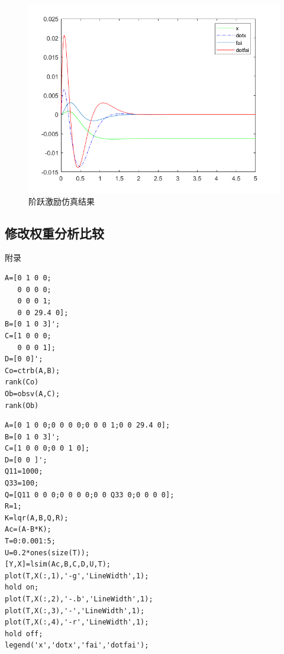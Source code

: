 \begin{figure}[hbpt]
\centering
\includegraphics[width=12cm]{1000_100_2.png}
\caption{阶跃激励仿真结果}\label{1000_100_2}
\end{figure}

\subsection{修改权重分析比较}


\newpage
	\appendix
	\begin{center}
		\heiti{} 附\hspace{1pc}录
	\end{center}

\begin{lstlisting}
A=[0 1 0 0;
   0 0 0 0;
   0 0 0 1;
   0 0 29.4 0];
B=[0 1 0 3]';
C=[1 0 0 0;
   0 0 0 1];
D=[0 0]';
Co=ctrb(A,B);
rank(Co)
Ob=obsv(A,C);
rank(Ob)
\end{lstlisting}

\begin{lstlisting}
A=[0 1 0 0;0 0 0 0;0 0 0 1;0 0 29.4 0];
B=[0 1 0 3]';
C=[1 0 0 0;0 0 1 0];
D=[0 0 ]';
Q11=1000;
Q33=100;
Q=[Q11 0 0 0;0 0 0 0;0 0 Q33 0;0 0 0 0];
R=1;
K=lqr(A,B,Q,R);
Ac=(A-B*K);
T=0:0.001:5;
U=0.2*ones(size(T));
[Y,X]=lsim(Ac,B,C,D,U,T);
plot(T,X(:,1),'-g','LineWidth',1);
hold on;
plot(T,X(:,2),'-.b','LineWidth',1);
plot(T,X(:,3),'-','LineWidth',1);
plot(T,X(:,4),'-r','LineWidth',1);
hold off;
legend('x','dotx','fai','dotfai');
\end{lstlisting}
